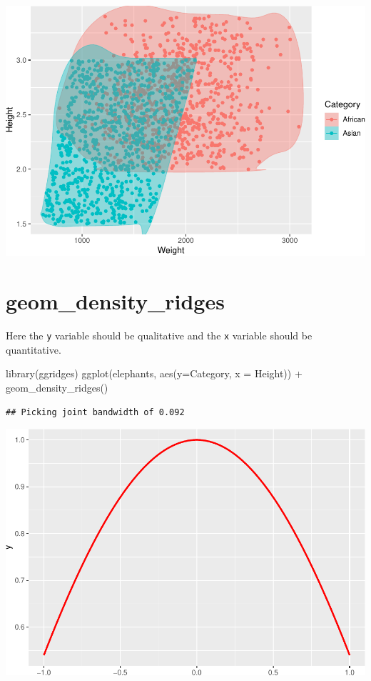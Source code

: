 \documentclass[
]{book}
\newenvironment{Shaded}{\begin{snugshade}}{\end{snugshade}}
\newcommand{\AttributeTok}[1]{\textcolor[rgb]{0.77,0.63,0.00}{#1}}
\newcommand{\FunctionTok}[1]{\textcolor[rgb]{0.00,0.00,0.00}{#1}}
\newcommand{\NormalTok}[1]{#1}
\newcommand{\SpecialCharTok}[1]{\textcolor[rgb]{0.00,0.00,0.00}{#1}}
\begin{document}
\includegraphics{Data-Visualisation-geom-Encyclopedia_files/figure-latex/unnamed-chunk-37-1.pdf}

\hypertarget{geom_density_ridges}{%
\section{geom\_density\_ridges}\label{geom_density_ridges}}

Here the \texttt{y} variable should be qualitative and the \texttt{x} variable should be quantitative.

\begin{Shaded}
\begin{Highlighting}[]
\FunctionTok{library}\NormalTok{(ggridges)}
\FunctionTok{ggplot}\NormalTok{(elephants, }\FunctionTok{aes}\NormalTok{(}\AttributeTok{y=}\NormalTok{Category, }\AttributeTok{x =}\NormalTok{ Height)) }\SpecialCharTok{+} 
    \FunctionTok{geom\_density\_ridges}\NormalTok{()}
\end{Highlighting}
\end{Shaded}

\begin{verbatim}
## Picking joint bandwidth of 0.092
\end{verbatim}

\includegraphics{Data-Visualisation-geom-Encyclopedia_files/figure-latex/unnamed-chunk-38-1.pdf}
\end{document}
